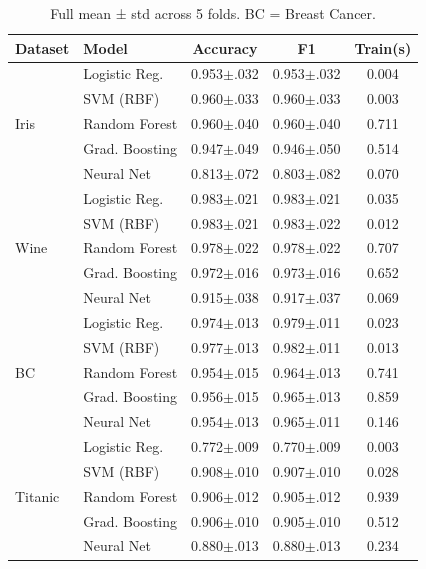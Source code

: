 \documentclass[10pt,twocolumn]{article}
\begin{document}
\begin{table}[h]
\centering
\caption{Full mean ± std across 5 folds. BC = Breast Cancer.}
\label{tab:full}
\small
\begin{tabular}{llccc}
\toprule
\textbf{Dataset} & \textbf{Model} & \textbf{Accuracy} & \textbf{F1} & \textbf{Train(s)} \\
\midrule
\multirow{5}{*}{Iris}
  & Logistic Reg.  & 0.953$\pm$.032 & 0.953$\pm$.032 & 0.004 \\
  & SVM (RBF)      & 0.960$\pm$.033 & 0.960$\pm$.033 & 0.003 \\
  & Random Forest  & 0.960$\pm$.040 & 0.960$\pm$.040 & 0.711 \\
  & Grad. Boosting & 0.947$\pm$.049 & 0.946$\pm$.050 & 0.514 \\
  & Neural Net     & 0.813$\pm$.072 & 0.803$\pm$.082 & 0.070 \\
\midrule
\multirow{5}{*}{Wine}
  & Logistic Reg.  & 0.983$\pm$.021 & 0.983$\pm$.021 & 0.035 \\
  & SVM (RBF)      & 0.983$\pm$.021 & 0.983$\pm$.022 & 0.012 \\
  & Random Forest  & 0.978$\pm$.022 & 0.978$\pm$.022 & 0.707 \\
  & Grad. Boosting & 0.972$\pm$.016 & 0.973$\pm$.016 & 0.652 \\
  & Neural Net     & 0.915$\pm$.038 & 0.917$\pm$.037 & 0.069 \\
\midrule
\multirow{5}{*}{BC}
  & Logistic Reg.  & 0.974$\pm$.013 & 0.979$\pm$.011 & 0.023 \\
  & SVM (RBF)      & 0.977$\pm$.013 & 0.982$\pm$.011 & 0.013 \\
  & Random Forest  & 0.954$\pm$.015 & 0.964$\pm$.013 & 0.741 \\
  & Grad. Boosting & 0.956$\pm$.015 & 0.965$\pm$.013 & 0.859 \\
  & Neural Net     & 0.954$\pm$.013 & 0.965$\pm$.011 & 0.146 \\
\midrule
\multirow{5}{*}{Titanic}
  & Logistic Reg.  & 0.772$\pm$.009 & 0.770$\pm$.009 & 0.003 \\
  & SVM (RBF)      & 0.908$\pm$.010 & 0.907$\pm$.010 & 0.028 \\
  & Random Forest  & 0.906$\pm$.012 & 0.905$\pm$.012 & 0.939 \\
  & Grad. Boosting & 0.906$\pm$.010 & 0.905$\pm$.010 & 0.512 \\
  & Neural Net     & 0.880$\pm$.013 & 0.880$\pm$.013 & 0.234 \\
\bottomrule
\end{tabular}
\end{table}
\end{document}
